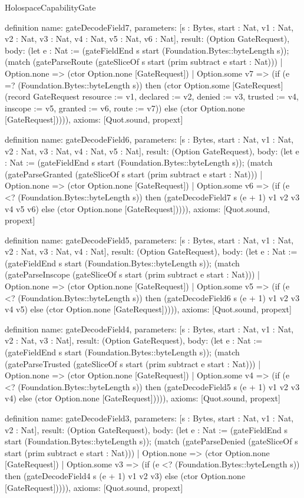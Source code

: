 \begin{lexlean}{HolospaceCapabilityGate}
\begin{semanticmodule}
definition{
  name: gateDecodeField7,
  parameters: [s : Bytes, start : Nat, v1 : Nat, v2 : Nat, v3 : Nat, v4 : Nat, v5 : Nat, v6 : Nat],
  result: (Option GateRequest),
  body: (let e : Nat := (gateFieldEnd s start (Foundation.Bytes::byteLength s)); (match (gateParseRoute (gateSliceOf s start (prim subtract e start : Nat)))
    | Option.none => (ctor Option.none [GateRequest])
    | Option.some v7 => (if (e =? (Foundation.Bytes::byteLength s)) then (ctor Option.some [GateRequest] (record GateRequest {resource := v1, declared := v2, denied := v3, trusted := v4, inscope := v5, granted := v6, route := v7})) else (ctor Option.none [GateRequest])))),
  axioms: [Quot.sound, propext]
}

definition{
  name: gateDecodeField6,
  parameters: [s : Bytes, start : Nat, v1 : Nat, v2 : Nat, v3 : Nat, v4 : Nat, v5 : Nat],
  result: (Option GateRequest),
  body: (let e : Nat := (gateFieldEnd s start (Foundation.Bytes::byteLength s)); (match (gateParseGranted (gateSliceOf s start (prim subtract e start : Nat)))
    | Option.none => (ctor Option.none [GateRequest])
    | Option.some v6 => (if (e <? (Foundation.Bytes::byteLength s)) then (gateDecodeField7 s (e + 1) v1 v2 v3 v4 v5 v6) else (ctor Option.none [GateRequest])))),
  axioms: [Quot.sound, propext]
}

definition{
  name: gateDecodeField5,
  parameters: [s : Bytes, start : Nat, v1 : Nat, v2 : Nat, v3 : Nat, v4 : Nat],
  result: (Option GateRequest),
  body: (let e : Nat := (gateFieldEnd s start (Foundation.Bytes::byteLength s)); (match (gateParseInscope (gateSliceOf s start (prim subtract e start : Nat)))
    | Option.none => (ctor Option.none [GateRequest])
    | Option.some v5 => (if (e <? (Foundation.Bytes::byteLength s)) then (gateDecodeField6 s (e + 1) v1 v2 v3 v4 v5) else (ctor Option.none [GateRequest])))),
  axioms: [Quot.sound, propext]
}

definition{
  name: gateDecodeField4,
  parameters: [s : Bytes, start : Nat, v1 : Nat, v2 : Nat, v3 : Nat],
  result: (Option GateRequest),
  body: (let e : Nat := (gateFieldEnd s start (Foundation.Bytes::byteLength s)); (match (gateParseTrusted (gateSliceOf s start (prim subtract e start : Nat)))
    | Option.none => (ctor Option.none [GateRequest])
    | Option.some v4 => (if (e <? (Foundation.Bytes::byteLength s)) then (gateDecodeField5 s (e + 1) v1 v2 v3 v4) else (ctor Option.none [GateRequest])))),
  axioms: [Quot.sound, propext]
}

definition{
  name: gateDecodeField3,
  parameters: [s : Bytes, start : Nat, v1 : Nat, v2 : Nat],
  result: (Option GateRequest),
  body: (let e : Nat := (gateFieldEnd s start (Foundation.Bytes::byteLength s)); (match (gateParseDenied (gateSliceOf s start (prim subtract e start : Nat)))
    | Option.none => (ctor Option.none [GateRequest])
    | Option.some v3 => (if (e <? (Foundation.Bytes::byteLength s)) then (gateDecodeField4 s (e + 1) v1 v2 v3) else (ctor Option.none [GateRequest])))),
  axioms: [Quot.sound, propext]
}


\end{semanticmodule}
\end{lexlean}
